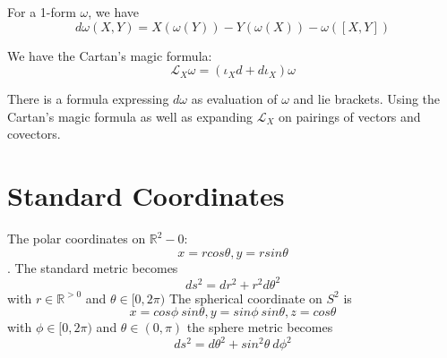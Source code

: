 \documentclass[main.tex]{subfiles}
\begin{document}
For a 1-form $\omega$, we have 
$$
d\omega(X,Y) = X(\omega(Y)) - Y(\omega(X)) - \omega([X,Y])
$$

We have the Cartan's magic formula:
$$
\mathcal{L}_X \omega = (\iota_X d + d \iota_X) \omega
$$

There is a formula expressing $d\omega$ as evaluation of $\omega$ and lie brackets.
Using the Cartan's magic formula as well as expanding $\mathcal{L}_X$ on pairings of vectors and covectors.

\section{Standard Coordinates}
The polar coordinates on $\mathbb{R}^2 - {0}$:
$$
x = r cos \theta, y = r sin \theta
$$
. The standard metric becomes 
$$
ds^2 = dr^2 + r^2 d\theta^2
$$
with $r \in \mathbb{R}^{>0}$ and $\theta \in [0,2\pi)$
The spherical coordinate on $S^2$ is 
$$
x = cos \phi \ sin \theta, 
y = sin \phi \ sin \theta, 
z = cos \theta 
$$
with $\phi \in [0,2\pi)$ and $\theta \in (0, \pi)$
the sphere metric becomes 
$$
ds^2 = d\theta^2 + sin^2 \theta \ d\phi^2
$$
\end{document}
